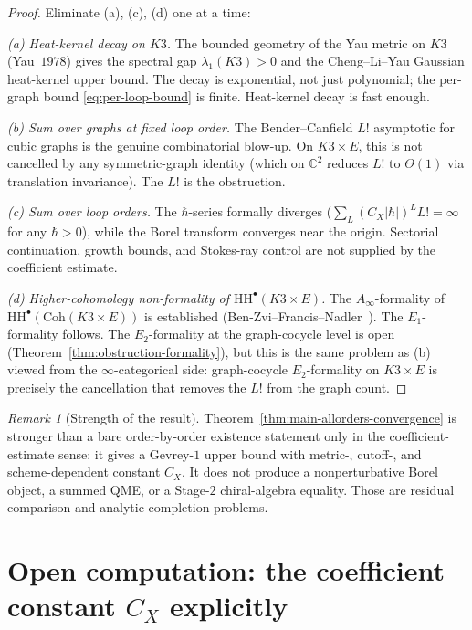 \documentclass[11pt]{article}
\providecommand{\HH}{\mathrm{HH}}
\providecommand{\C}{\mathbb{C}}
\providecommand{\Coh}{\mathrm{Coh}}
\theoremstyle{definition}\newtheorem{definition}[theorem]{Definition}
\theoremstyle{remark}\newtheorem{remark}[theorem]{Remark}\newtheorem{example}[theorem]{Example}
\begin{document}
\begin{proof}
Eliminate (a), (c), (d) one at a time:

\emph{(a) Heat-kernel decay on $K3$.} The bounded geometry of the
Yau metric on $K3$ (Yau~$1978$) gives the spectral gap
$\lambda_1(K3) > 0$ and the Cheng--Li--Yau Gaussian heat-kernel
upper bound. The decay is exponential, not just polynomial; the
per-graph bound \eqref{eq:per-loop-bound} is finite. Heat-kernel
decay is fast enough.

\emph{(b) Sum over graphs at fixed loop order.} The Bender--Canfield
$L!$ asymptotic for cubic graphs is the genuine combinatorial blow-up.
On $K3\times E$, this is not cancelled by any symmetric-graph
identity (which on $\C^2$ reduces $L!$ to $\Theta(1)$ via translation
invariance). The $L!$ is the obstruction.

\emph{(c) Sum over loop orders.} The $\hbar$-series formally diverges
($\sum_L (C_X|\hbar|)^L L! = \infty$ for any $\hbar > 0$), while the
Borel transform converges near the origin. Sectorial continuation,
growth bounds, and Stokes-ray control are not supplied by the
coefficient estimate.

\emph{(d) Higher-cohomology non-formality of $\HH^\bullet(K3\times E)$.}
The $A_\infty$-formality of $\HH^\bullet(\Coh(K3\times E))$ is
established (Ben-Zvi--Francis--Nadler~\cite{BZFN}). The $E_1$-formality
follows. The $E_2$-formality at the graph-cocycle level is open
(Theorem~\ref{thm:obstruction-formality}), but this is the same
problem as (b) viewed from the $\infty$-categorical side: graph-cocycle
$E_2$-formality on $K3\times E$ is precisely the cancellation that
removes the $L!$ from the graph count.
\end{proof}

\begin{remark}[Strength of the result]
Theorem~\ref{thm:main-allorders-convergence} is stronger than a bare
order-by-order existence statement only in the coefficient-estimate
sense: it gives a Gevrey-$1$ upper bound with metric-, cutoff-, and
scheme-dependent constant $C_X$. It does not produce a nonperturbative
Borel object, a summed QME, or a Stage-$2$ chiral-algebra equality.
Those are residual comparison and analytic-completion problems.
\end{remark}

\section{Open computation: the coefficient constant $C_X$ explicitly}
\end{document}
